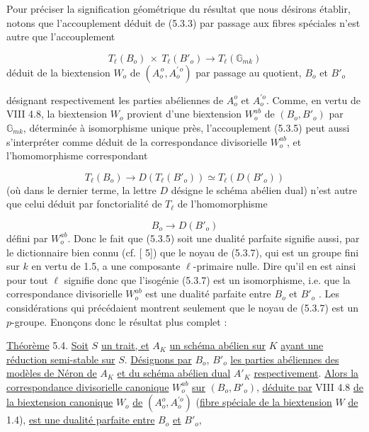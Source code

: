 Pour préciser la signification géométrique du résultat que nous désirons établir, notons que l'accouplement déduit de (5.3.3) par passage aux fibres spéciales n'est autre que l'accouplement

\begin{equation}\tag{5.3.5}
T_\ell(B_o) \ \times \ T_\ell(B'_o) \longrightarrow T_\ell(\mathbb{G}_{mk})
\end{equation}
déduit de la biextension $W_o$ de $(A_o^{\,o}, A_o^{\prime\,o})$ par passage au quotient, $B_o$ et $B'_o$



désignant respectivement les parties abéliennes de $A_o^o$ et $A_o^{\prime o}$. Comme, en vertu de VIII 4.8, la biextension $W_o$ provient d'une biextension $W_o^{ab}$ de $(B_o,B'_o)$ par $\mathbb{G}_{mk}$, déterminée à isomorphisme unique près, l'accouplement (5.3.5) peut aussi s'interpréter comme déduit de la correspondance divisorielle $W_o^{ab}$, et l'homomorphisme correspondant

\begin{equation}\tag{5.3.6}
T_\ell(B_o) \longrightarrow D(T_\ell(B'_o)) \simeq T_\ell(D(B'_o))
\end{equation}
(où dans le dernier terme, la lettre $D$ désigne le schéma abélien dual) n'est autre que celui déduit par fonctorialité de $T_\ell$ de l'homomorphisme

\begin{equation}\tag{5.3.7}
B_o \longrightarrow D(B'_o)
\end{equation}
défini par $W_o^{ab}$. Donc le fait que (5.3.5) soit une dualité parfaite signifie aussi, par le dictionnaire bien connu (cf. [ 5]) que le noyau de (5.3.7), qui est un groupe fini sur $k$ en vertu de 1.5, a une composante $\ell$-primaire nulle. Dire qu'il en est ainsi pour tout $\ell$ signifie donc que l'isogénie (5.3.7) est un isomorphisme, i.e. que la correspondance divisorielle $W_o^{ab}$ est une dualité parfaite entre $B_o$ et $B'_o$ . Les considérations qui précédaient montrent seulement que le noyau de (5.3.7) est un $p$-groupe. Enonçons donc le résultat plus complet :

\underline{Théorème} 5.4. \underline{Soit} $S$ \underline{un trait, et} $A_K$ \underline{un schéma abélien sur} $K$ \underline{ayant une réduction semi-stable sur} $S$. \underline{Désignons par} $B_o$, $B'_o$ \underline{les parties abéliennes des modèles de Néron de} $A_K$ \underline{et du schéma abélien dual} $A'_K$ \underline{respectivement}. \underline{Alors la correspondance divisorielle canonique} $W_o^{ab}$ \underline{sur} $(B_o,B'_o)$, \underline{déduite par} VIII 4.8 \underline{de la biextension canonique} $W_o$ \underline{de} $(A_o^o,A_o^{\prime o})$ (\underline{fibre spéciale de la biextension} $W$ \underline{de} 1.4), \underline{est une dualité parfaite entre} $B_o$ \underline{et} $B'_o$,


